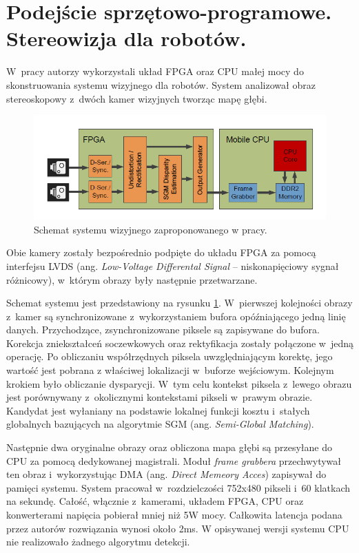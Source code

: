 \section{Podejście sprzętowo-programowe. Stereowizja dla robotów.}

W~pracy \cite{honegger2014real} autorzy wykorzystali układ FPGA oraz CPU małej mocy do skonstruowania systemu wizyjnego dla robotów.
System analizował obraz stereoskopowy z~dwóch kamer wizyjnych tworząc mapę głębi.
\begin{figure}[h]
\centering
\includegraphics[width=1\textwidth]{images/honegger2014real_Fig1}
\caption{Schemat systemu wizyjnego zaproponowanego w pracy\cite{honegger2014real}.}
\label{fig:honegger2014real_Fig1}
\end{figure}
Obie kamery zostały bezpośrednio podpięte do układu FPGA za pomocą interfejsu LVDS (ang. \textit{Low-Voltage Differental Signal} -- niskonapięciowy sygnał różnicowy), w~którym obrazy były następnie przetwarzane.

Schemat systemu jest przedstawiony na rysunku \ref{fig:honegger2014real_Fig1}. 
W~pierwszej kolejności obrazy z~kamer są synchronizowane z~wykorzystaniem bufora opóźniającego jedną linię danych.
Przychodzące, zsynchronizowane piksele są zapisywane do bufora. 
Korekcja zniekształceń soczewkowych oraz rektyfikacja zostały połączone w~jedną operację. 
Po obliczaniu współrzędnych piksela uwzględniającym korektę, jego wartość jest pobrana z właściwej lokalizacji w~buforze wejściowym. 
Kolejnym krokiem było obliczanie dysparycji. 
W~tym celu kontekst piksela z~lewego obrazu jest porównywany z~okolicznymi kontekstami pikseli w~prawym obrazie. 
Kandydat jest wyłaniany na podstawie lokalnej funkcji kosztu i~stałych globalnych bazujących na algorytmie SGM (ang. \textit{Semi-Global Matching}).

Następnie dwa oryginalne obrazy oraz obliczona mapa głębi są przesyłane do CPU za pomocą dedykowanej magistrali.
Moduł \textit{frame grabbera} przechwytywał ten obraz i~wykorzystując DMA (ang. \textit{Direct Memeory Acces}) zapisywał do pamięci systemu.
System pracował w~rozdzielczości 752x480 pikseli i~60 klatkach na sekundę.
Całość, włącznie z~kamerami, układem FPGA, CPU oraz konwerterami napięcia pobierał mniej niż 5W mocy.
Całkowita latencja podana przez autorów rozwiązania wynosi około 2ms. W opisywanej wersji systemu CPU nie realizowało żadnego algorytmu detekcji.


